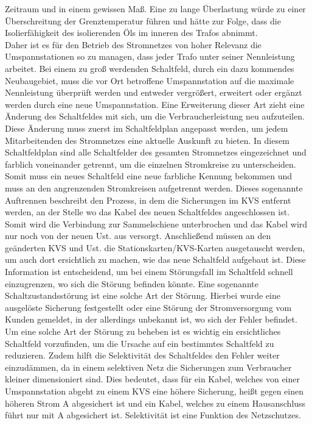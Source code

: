 Zeitraum und in einem gewissen Maß. Eine zu lange Überlastung würde zu einer Überschreitung der Grenztemperatur führen und hätte zur Folge, dass die 
Isolierfähigkeit des isolierenden Öls im inneren des Trafos abnimmt. \autocite{Werth.2016}
\\
Daher ist es für den Betrieb des Stromnetzes von hoher Relevanz die Umspannstationen so zu managen, dass jeder Trafo unter seiner Nennleistung arbeitet. Bei 
einem zu groß werdenden Schaltfeld, durch ein \zB dazu kommendes Neubaugebiet, muss die vor Ort betroffene Umspannstation auf die maximale Nennleistung 
überprüft werden und entweder vergrößert, erweitert oder ergänzt werden durch eine neue Umspannstation. Eine Erweiterung dieser Art zieht eine Änderung des 
Schaltfeldes mit sich, um die Verbraucherleistung neu aufzuteilen. Diese Änderung muss zuerst im Schaltfeldplan angepasst werden, um jedem Mitarbeitenden 
des Stromnetzes eine aktuelle Auskunft zu bieten. In diesem Schaltfeldplan sind alle Schaltfelder des gesamten Stromnetzes eingezeichnet und farblich 
voneinander getrennt, um die einzelnen Stromkreise zu unterscheiden. Somit muss ein neues Schaltfeld eine neue farbliche Kennung bekommen und muss an den 
angrenzenden Stromkreisen aufgetrennt werden. Dieses sogenannte Auftrennen beschreibt den Prozess, in dem die Sicherungen im KVS entfernt werden, an der 
Stelle wo das Kabel des neuen Schaltfeldes angeschlossen ist. Somit wird die Verbindung zur Sammelschiene unterbrochen und das Kabel wird nur noch von der 
neuen Ust. aus versorgt. Anschließend müssen an den geänderten KVS und Ust. die Stationskarten/KVS-Karten ausgetauscht werden, um auch dort ersichtlich 
zu machen, wie das neue Schaltfeld aufgebaut ist. Diese Information ist entscheidend, um bei einem Störungsfall im Schaltfeld schnell einzugrenzen, wo 
sich die Störung befinden könnte. Eine sogenannte Schaltzustandsstörung ist \zB eine solche Art der Störung. Hierbei wurde eine ausgelöste Sicherung 
festgestellt oder eine Störung der Stromversorgung vom Kunden gemeldet, in der allerdings unbekannt ist, wo sich der Fehler befindet. Um eine solche Art 
der Störung zu beheben ist es wichtig ein ersichtliches Schaltfeld vorzufinden, um die Ursache auf ein bestimmtes Schaltfeld zu reduzieren. Zudem hilft 
die Selektivität des Schaltfeldes den Fehler weiter einzudämmen, da in einem selektiven Netz die Sicherungen zum Verbraucher kleiner dimensioniert sind. 
Dies bedeutet, dass für ein Kabel, welches von einer Umspannstation abgeht zu einem KVS eine höhere Sicherung, heißt gegen einen höheren Strom  A 
abgesichert ist und ein Kabel, welches zu einem Hausanschluss führt nur mit  A abgesichert ist. Selektivität ist eine Funktion des Netzschutzes. 
